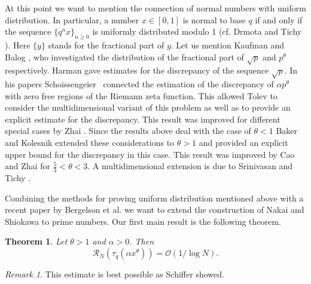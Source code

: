 \documentclass[a4paper,10pt]{amsart}
\newtheorem{thm}[lem]{Theorem}
\numberwithin{equation}{section}
\theoremstyle{definition}
\theoremstyle{remark}
\newtheorem{rem}[lem]{Remark}
\begin{document}
At this point we want to mention the connection of normal numbers with uniform
distribution. In particular, a number $x\in[0,1]$ is normal to base $q$ if and
only if the sequence $\{q^nx\}_{n\geq0}$ is uniformly distributed modulo 1
(cf. Drmota and Tichy
\cite{drmota_tichy1997:sequences_discrepancies_and}). Here $\{y\}$
stands for the fractional part of $y$. Let us mention
Kaufman \cite{kaufman1979:distribution_surd_p} and
Balog \cite{balog1985:distribution_p_heta,balog1983:fractional_part_p}, who
investigated the distribution of the fractional part of $\sqrt p$ and
$p^\theta$ respectively. Harman \cite{harman1983:distribution_sqrtp_modulo}
gave estimates for the discrepancy of the sequence $\sqrt p$. In his papers
Schoissengeier~\cite{schoissengeier1979:connection_between_zeros,
  schoissengeier1978:neue_diskrepanz_fuer} connected the estimation of the
discrepancy of $\alpha p^\theta$ with zero free regions of the Riemann zeta
function. This allowed Tolev
\cite{tolev1991:simultaneous_distribution_fractional} to consider the
multidimensional variant of this problem as well as to provide an explicit
estimate for the discrepancy. This result was improved for different special
cases by Zhai \cite{zhai2001:simultaneous_distribution_fractional}. Since the
results above deal with the case of $\theta<1$ Baker and Kolesnik
\cite{baker_kolesnik1985:distribution_p_alpha} extended these considerations to
$\theta>1$ and provided an explicit upper bound for the discrepancy in this
case. This result was improved by Cao and Zhai
\cite{cao_zhai1999:distribution_p_alpha} for $\frac53<\theta<3$. A
multidimensional extension is due to Srinivasan and Tichy
\cite{srinivasan_tichy1993:uniform_distribution_prime}.

Combining the methods for proving uniform distribution mentioned above with a
recent paper by Bergelson et al.
\cite{bergelson_kolesnik_madritsch+2012:uniform_distribution_prime} we want to 
extend the construction of Nakai and Shiokawa
\cite{Nakai_Shiokawa1990:class_normal_numbers} to prime numbers. Our first main
result is the following theorem.

\begin{thm}\label{thm:normal}
Let $\theta>1$ and $\alpha>0$. Then
\[
\mathcal{R}_N(\tau_q(\alpha x^\theta))=\mathcal{O}(1/\log N).
\]
\end{thm}

\begin{rem}
This estimate is best possible as Schiffer \cite{schiffer1986:discrepancy_normal_numbers} showed.
\end{rem}
\end{document}
